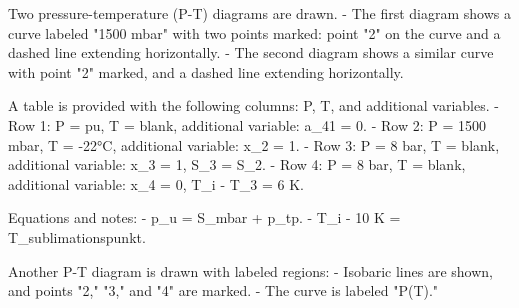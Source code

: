 Two pressure-temperature (P-T) diagrams are drawn.  
- The first diagram shows a curve labeled "1500 mbar" with two points marked: point "2" on the curve and a dashed line extending horizontally.  
- The second diagram shows a similar curve with point "2" marked, and a dashed line extending horizontally.  

A table is provided with the following columns: P, T, and additional variables.  
- Row 1: P = pu, T = blank, additional variable: a_41 = 0.  
- Row 2: P = 1500 mbar, T = -22°C, additional variable: x_2 = 1.  
- Row 3: P = 8 bar, T = blank, additional variable: x_3 = 1, S_3 = S_2.  
- Row 4: P = 8 bar, T = blank, additional variable: x_4 = 0, T_i - T_3 = 6 K.  

Equations and notes:  
- p_u = S_mbar + p_tp.  
- T_i - 10 K = T_sublimationspunkt.  

Another P-T diagram is drawn with labeled regions:  
- Isobaric lines are shown, and points "2," "3," and "4" are marked.  
- The curve is labeled "P(T)."
